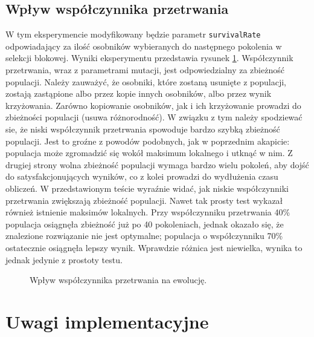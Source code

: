 \documentclass[a4paper,12pt,leqno]{article}
\begin{document}
\subsection{Wpływ współczynnika przetrwania}
W tym eksperymencie modyfikowany będzie parametr \texttt{survivalRate} odpowiadający za ilość osobników wybieranych do następnego pokolenia w
selekcji blokowej. Wyniki eksperymentu przedstawia rysunek \ref{surv}. Współczynnik przetrwania, wraz z parametrami mutacji, jest odpowiedzialny
za zbieżność populacji. Należy zauważyć, że osobniki, które zostaną usunięte z populacji, zostają zastąpione albo przez kopie innych osobników,
albo przez wynik krzyżowania. Zarówno kopiowanie osobników, jak i ich krzyżowanie prowadzi do zbieżności populacji (usuwa różnorodność). W związku
z tym należy spodziewać sie, że niski współczynnik przetrwania spowoduje bardzo szybką zbieżność populacji. Jest to groźne z powodów podobnych,
jak w poprzednim akapicie: populacja może zgromadzić się wokół maksimum lokalnego i utknąć w nim. Z drugiej strony wolna zbieżność populacji
wymaga bardzo wielu pokoleń, aby dojść do satysfakcjonujących wyników, co z kolei prowadzi do wydłużenia czasu obliczeń. W przedstawionym teście
wyraźnie widać, jak niskie współczynniki przetrwania zwiększają zbieżność populacji. Nawet tak prosty test wykazał również istnienie maksimów
lokalnych. Przy współczynniku przetrwania 40\% populacja osiągnęła zbieżność już po 40 pokoleniach, jednak okazało się, że znalezione rozwiązanie
nie jest optymalne; populacja o współczynniku 70\% ostatecznie osiągnęła lepszy wynik. Wprawdzie różnica jest niewielka, wynika to jednak jedynie
z prostoty testu.

\begin{figure}\centering
\footnotesize\vspace{-2em}
\normalsize\caption{Wpływ współczynnika przetrwania na ewolucję.}\label{surv}
\end{figure}

\section{Uwagi implementacyjne}
\end{document}
